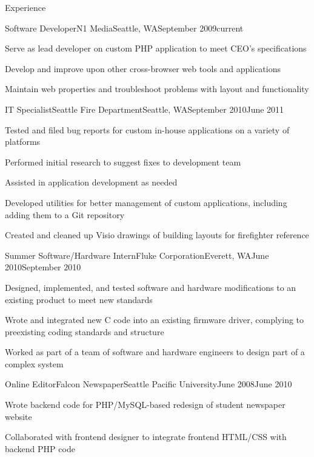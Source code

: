 \documentclass[letterpaper,10pt]{article}
\newcommand{\optarg}[2][]{%
  \ifthenelse{\isempty{#1}}%
    {}%
    {#2}%
}
\newenvironment{res_section}[1]{%
  \vskip 6pt
  \noindent
  {\Large \textbf{#1}}\\
  \rule[8pt]{\textwidth}{0.5pt}
  \vskip -8pt
}{
}
\newenvironment{res_subsection}[1]{%
  \vskip 4pt
  \noindent
  \textbf{\large{#1}}
  \begin{itemize}
}{
  \end{itemize}
}
\newenvironment{res_experienceitem}[5]{%
  \begin{res_subsection}{#1 - \em{%
  #2%
  \optarg[#3]{, #3}%
  \optarg[#4]{, #4}%
  \optarg[#5]{ -- #5}%
  }}
}{
  \end{res_subsection}
}
\begin{document}
\begin{res_section}{Experience}
\begin{res_experienceitem}{Software Developer}{N1 Media}{Seattle, WA}{September 2009}{current}
  \item Serve as lead developer on custom PHP application to meet CEO's specifications
  \item Develop and improve upon other cross-browser web tools and applications
  \item Maintain web properties and troubleshoot problems with layout and functionality
\end{res_experienceitem}
\begin{res_experienceitem}{IT Specialist}{Seattle Fire Department}{Seattle, WA}{September 2010}{June 2011}
  \item Tested and filed bug reports for custom in-house applications on a variety of platforms
  \item Performed initial research to suggest fixes to development team
  \item Assisted in application development as needed
  \item Developed utilities for better management of custom applications, including adding them to a Git repository
  \item Created and cleaned up Visio drawings of building layouts for firefighter reference
\end{res_experienceitem}
\begin{res_experienceitem}{Summer Software/Hardware Intern}{Fluke Corporation}{Everett, WA}{June 2010}{September 2010}
  \item Designed, implemented, and tested software and hardware modifications to an existing product to meet new standards
  \item Wrote and integrated new C code into an existing firmware driver, complying to preexisting coding standards and structure
  \item Worked as part of a team of software and hardware engineers to design part of a complex system
\end{res_experienceitem}
\begin{res_experienceitem}{Online Editor}{Falcon Newspaper}{Seattle Pacific University}{June 2008}{June 2010}
  \item Wrote backend code for PHP/MySQL-based redesign of student newspaper website
  \item Collaborated with frontend designer to integrate frontend HTML/CSS with backend PHP code

\end{res_experienceitem}
\end{res_section}
\end{document}
